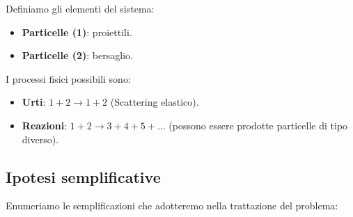Definiamo gli elementi del sistema:
\begin{itemize}
    \item \textbf{Particelle (1)}: proiettili.
    \item \textbf{Particelle (2)}: bersaglio.
\end{itemize}

I processi fisici possibili sono:
\begin{itemize}
    \item \textbf{Urti}: \( 1 + 2 \longrightarrow 1 + 2 \) (Scattering elastico).
    \item \textbf{Reazioni}: \( 1 + 2 \longrightarrow 3 + 4 + 5 + \dots \) (possono essere prodotte particelle di tipo diverso).
\end{itemize}

\subsection{Ipotesi semplificative}
Enumeriamo le semplificazioni che adotteremo nella trattazione del problema:

